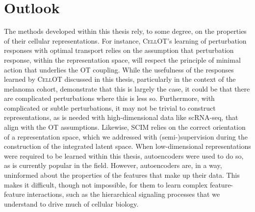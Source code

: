 \section{Outlook}
The methods developed within this thesis rely, to some degree, on the properties of their cellular representations.
For instance, \textsc{CellOT}'s learning of perturbation responses with optimal transport relies on the assumption that perturbation response, within the representation space, will respect the principle of minimal action that underlies the OT coupling.
While the usefulness of the responses learned by \textsc{CellOT} discussed in this thesis, particularly in the context of the melanoma cohort, demonstrate that this is largely the case, it could be that there are complicated perturbations where this is less so.
Furthermore, with complicated or subtle perturbations, it may not be trivial to construct representations, as is needed with high-dimensional data like scRNA-seq, that align with the OT assumptions.
Likewise, \textsc{SCIM}
relies on the correct orientation of a representation space, which we addressed with (semi-)supervision during the construction of the integrated latent space.
When low-dimensional representations were required to be learned within this thesis,
autoencoders were used to do so, as is currently popular in the field.
However, autoencoders are, in a way, uninformed about the properties of the features that make up their data.
This makes it difficult, though not impossible, for them to learn complex feature-feature interactions, such as the hierarchical signaling processes that we understand to drive much of cellular biology.

